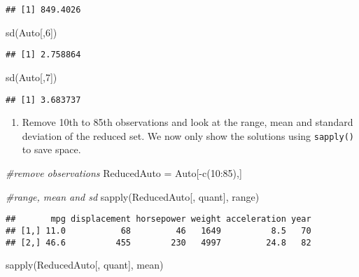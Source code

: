 \documentclass[
]{article}
\newenvironment{Shaded}{\begin{snugshade}}{\end{snugshade}}
\newcommand{\CommentTok}[1]{\textcolor[rgb]{0.56,0.35,0.01}{\textit{#1}}}
\newcommand{\DecValTok}[1]{\textcolor[rgb]{0.00,0.00,0.81}{#1}}
\newcommand{\FunctionTok}[1]{\textcolor[rgb]{0.00,0.00,0.00}{#1}}
\newcommand{\NormalTok}[1]{#1}
\newcommand{\OtherTok}[1]{\textcolor[rgb]{0.56,0.35,0.01}{#1}}
\newcommand{\SpecialCharTok}[1]{\textcolor[rgb]{0.00,0.00,0.00}{#1}}
\providecommand{\tightlist}{%
  \setlength{\itemsep}{0pt}\setlength{\parskip}{0pt}}
\begin{document}
\begin{verbatim}
## [1] 849.4026
\end{verbatim}

\begin{Shaded}
\begin{Highlighting}[]
\FunctionTok{sd}\NormalTok{(Auto[,}\DecValTok{6}\NormalTok{])}
\end{Highlighting}
\end{Shaded}

\begin{verbatim}
## [1] 2.758864
\end{verbatim}

\begin{Shaded}
\begin{Highlighting}[]
\FunctionTok{sd}\NormalTok{(Auto[,}\DecValTok{7}\NormalTok{])}
\end{Highlighting}
\end{Shaded}

\begin{verbatim}
## [1] 3.683737
\end{verbatim}

\begin{enumerate}
\def\labelenumi{\alph{enumi})}
\setcounter{enumi}{3}
\tightlist
\item
  Remove 10th to 85th observations and look at the range, mean and
  standard deviation of the reduced set. We now only show the solutions
  using \texttt{sapply()} to save space.
\end{enumerate}

\begin{Shaded}
\begin{Highlighting}[]
\CommentTok{\#remove observations}
\NormalTok{ReducedAuto }\OtherTok{=}\NormalTok{ Auto[}\SpecialCharTok{{-}}\FunctionTok{c}\NormalTok{(}\DecValTok{10}\SpecialCharTok{:}\DecValTok{85}\NormalTok{),]}

\CommentTok{\#range, mean and sd}
\FunctionTok{sapply}\NormalTok{(ReducedAuto[, quant], range)}
\end{Highlighting}
\end{Shaded}

\begin{verbatim}
##       mpg displacement horsepower weight acceleration year
## [1,] 11.0           68         46   1649          8.5   70
## [2,] 46.6          455        230   4997         24.8   82
\end{verbatim}

\begin{Shaded}
\begin{Highlighting}[]
\FunctionTok{sapply}\NormalTok{(ReducedAuto[, quant], mean)}
\end{Highlighting}
\end{Shaded}
\end{document}
